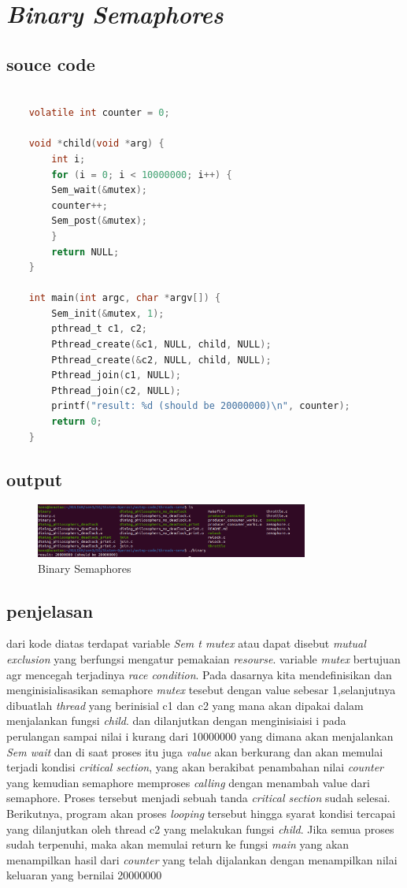 \documentclass[11pt,a4paper]{article}
\begin{document}
\section{\textit{Binary Semaphores}}
\subsection*{souce code}
\begin{lstlisting}[language = C]

	volatile int counter = 0;

	void *child(void *arg) {
		int i;
		for (i = 0; i < 10000000; i++) {
		Sem_wait(&mutex);
		counter++;
		Sem_post(&mutex);
		}
		return NULL;
	}

	int main(int argc, char *argv[]) {
		Sem_init(&mutex, 1); 
		pthread_t c1, c2;
		Pthread_create(&c1, NULL, child, NULL);
		Pthread_create(&c2, NULL, child, NULL);
		Pthread_join(c1, NULL);
		Pthread_join(c2, NULL);
		printf("result: %d (should be 20000000)\n", counter);
		return 0;
	}
\end{lstlisting}
\subsection*{output}
\begin{figure}[h]
	\centering
	\includegraphics[width=0.8\textwidth]{Figure/testing/percobaan-binary.png}
	\caption{Binary Semaphores}
\end{figure}

\subsection{penjelasan}
dari kode diatas terdapat variable \textit{Sem t mutex} atau dapat disebut \textit{mutual exclusion} yang berfungsi mengatur pemakaian \textit{resourse}. variable \textit{mutex} bertujuan agr mencegah terjadinya \textit{race condition}. Pada dasarnya  kita mendefinisikan dan menginisialisasikan semaphore \textit{mutex} tesebut dengan value sebesar 1,selanjutnya dibuatlah \textit{thread} yang berinisial c1 dan c2 yang mana akan dipakai dalam menjalankan fungsi \textit{child}. dan dilanjutkan dengan menginisiaisi i pada perulangan sampai nilai i kurang dari 10000000 yang dimana akan menjalankan \textit{Sem wait} dan di saat proses itu juga \textit{value} akan berkurang dan akan memulai terjadi kondisi \textit{critical section}, yang akan berakibat penambahan nilai \textit{counter} yang kemudian semaphore memproses \textit{calling} dengan menambah value dari semaphore. Proses tersebut menjadi sebuah tanda \textit{critical section} sudah selesai. Berikutnya, program akan proses \textit{looping} tersebut hingga syarat kondisi tercapai yang  dilanjutkan oleh thread c2 yang melakukan fungsi \textit{child}. Jika semua proses sudah terpenuhi, maka akan memulai return ke fungsi \textit{main} yang akan menampilkan hasil dari \textit{counter} yang telah dijalankan dengan menampilkan nilai keluaran yang bernilai 20000000
\end{document}
